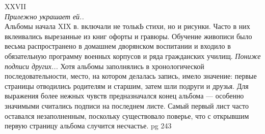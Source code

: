 XXVII\\
\emph{Прилежно украшает ей..}\\
 Альбомы начала XIX в. включали не толькЬ стихи, но и рисунки. Часто в них вклеивались вырезанные из книг офорты
и гравюры. Обучение живописи было весьма распространено в домашнем дворянском воспитании и входило в обязательную программу военных корпусов и ряда
гражданских училищ. 
\emph{Пониже подписи других...}
Хотя альбомы заполнялись в хронологической последовательности, место, на котором делалась запись, имело значение: первые
страницы отводились родителям и старшим, затем шли подруги и друзья. Для выражения более нежных
чувств предназначался конец альбома — особенно значимыми считались подписи на последнем листе. Самый первый лист часто оставался
незаполненным, поскольку существовало поверье, что с открывшим первую страницу альбома случится несчастье.
pg 243



